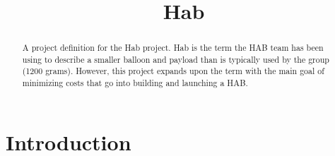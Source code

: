 \documentclass[conference]{IEEEtran} %
\title{\textmu{}Hab}
\author {
  \IEEEauthorblockN{%
    Austin~Bodzas\IEEEauthorrefmark{1}
  }
  \IEEEauthorblockA{%
    RIT Space Exploration, Rochester Institute of Technology \\ %
    Rochester, N.Y. \\
    Email:
    \IEEEauthorrefmark{1}abb6499@rit.edu
  }
}
\begin{document}
\maketitle%

\begin{abstract}

    A project definition for the \textmu{}Hab project.  \textmu{}Hab is the term the
    HAB team has been using to describe a smaller balloon and payload than is
    typically used by the group (1200 grams). However, this project expands upon
    the term with the main goal of minimizing costs that go into building and
    launching a HAB.\@
\end{abstract}

\label{sec:nomenclature}
\newcommand{\nomunit}[1]{%
\renewcommand{\nomentryend}{\hspace*{\fill}#1}}
\renewcommand{\nompreamble}{}
\printnomenclature{}



\section{Introduction}
\label{sec:introduction}
\end{document}
